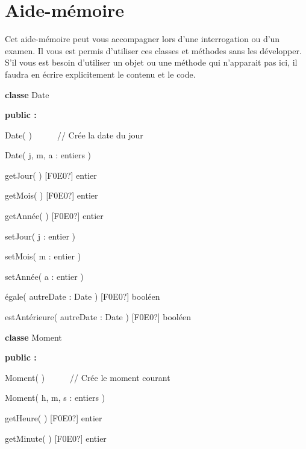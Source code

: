 \chapter*{Aide-mémoire}

{
Cet aide-mémoire peut vous accompagner lors d'une
interrogation ou d'un examen. Il vous est permis
d’utiliser ces classes et méthodes sans les développer. S’il vous est
besoin d’utiliser un objet ou une méthode qui
n'apparait pas ici, il faudra en écrire explicitement
le contenu et le code.}


\bigskip

{\sffamily
\textbf{classe} Date}

{\sffamily\bfseries
public :}

{\sffamily
{} Date( )\ \ \ \ \ \ // Crée la date du
jour}

{\sffamily
{} Date( j, m, a : entiers )}

{\sffamily
{} getJour( ) \textrm{[F0E0?]} entier}

{\sffamily
{} getMois( ) \textrm{[F0E0?]} entier}

{\sffamily
{} getAnnée( ) \textrm{[F0E0?]} entier}

{\sffamily
{} setJour( j : entier )}

{\sffamily
{} setMois( m : entier )}

{\sffamily
{} setAnnée( a : entier )}

{\sffamily
{} égale( autreDate : Date ) \textrm{[F0E0?]}
booléen}

{\sffamily
{} estAntérieure( autreDate : Date )
\textrm{[F0E0?]} booléen}

{\sffamily
{}}


\bigskip

{\sffamily
\textbf{classe} Moment}

{\sffamily\bfseries
public :}

{\sffamily
{} Moment( )\ \ \ \ \ \ // Crée le moment
courant}

{\sffamily
{} Moment( h, m, s : entiers )}

{\sffamily
{} getHeure( ) \textrm{[F0E0?]} entier}

{\sffamily
{} getMinute( ) \textrm{[F0E0?]} entier}

